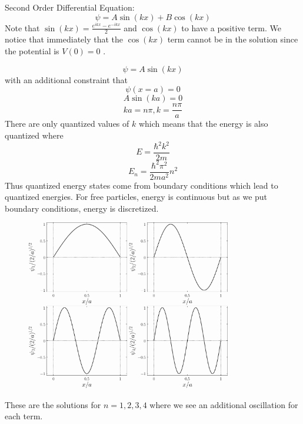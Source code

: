 \begin{remark}
    Second Order Differential Equation:
    \[
        \psi  = A \sin (kx) + B \cos (kx)
    \]
    Note that \(\sin (kx) = \frac{e^{ikx} - e^{-ikx}  }{2}\) and \(\cos (kx)\) to have a positive term. We notice
    that immediately that the \(\cos (kx)\) term cannot be in the solution since the potential is \(V(0) = 0\) . 

    \[
        \psi  = A \sin  (kx)
    \]
    with an additional constraint that 
    \[
        \psi (x=a) = 0
    \]
    \[
        A\sin (ka) = 0 
    \]
    \[
        ka =  n\pi , k = \frac{n\pi}{a}
    \]
    There are only quantized values of \(k\) which means that the energy is also quantized where 
    \[
        E = \frac{\hbar ^{2}  k^{2} }{2m}
    \]
    \[
        E_n = \frac{\hbar ^{2}  \pi ^{2} }{2ma^{2}} n^{2} 
    \]Thus quantized energy states come from boundary conditions which lead to quantized energies. For free particles, 
    energy is continuous but as we put boundary conditions, energy is discretized. 
    \begin{figure}[H]
        \centering
        \includegraphics[width=0.8\textwidth]{Figures/img3046.png}
        \caption{}
        \label{fig:}
    \end{figure}
    These are the solutions for \(n=1,2,3,4\) where we see an additional oscillation for each term. 
\end{remark}
